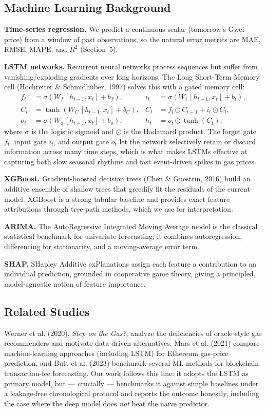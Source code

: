 \documentclass[11pt,a4paper]{article}
\begin{document}
\subsection{Machine Learning Background}
\textbf{Time-series regression.} We predict a continuous scalar (tomorrow's Gwei price) from a
window of past observations, so the natural error metrics are MAE, RMSE, MAPE, and $R^2$
(Section~5).

\textbf{LSTM networks.} Recurrent neural networks process sequences but suffer from
vanishing/exploding gradients over long horizons. The Long Short-Term Memory cell
(Hochreiter \& Schmidhuber, 1997) solves this with a gated memory cell:
\begin{align}
f_t &= \sigma(W_f\,[h_{t-1},x_t] + b_f), &
i_t &= \sigma(W_i\,[h_{t-1},x_t] + b_i), \\
\tilde{C}_t &= \tanh(W_C\,[h_{t-1},x_t] + b_C), &
C_t &= f_t \odot C_{t-1} + i_t \odot \tilde{C}_t, \\
o_t &= \sigma(W_o\,[h_{t-1},x_t] + b_o), &
h_t &= o_t \odot \tanh(C_t),
\end{align}
where $\sigma$ is the logistic sigmoid and $\odot$ is the Hadamard product. The forget gate
$f_t$, input gate $i_t$, and output gate $o_t$ let the network selectively retain or discard
information across many time steps, which is what makes LSTMs effective at capturing both slow
seasonal rhythms and fast event-driven spikes in gas prices.

\textbf{XGBoost.} Gradient-boosted decision trees (Chen \& Guestrin, 2016) build an additive
ensemble of shallow trees that greedily fit the residuals of the current model. XGBoost is a
strong tabular baseline and provides exact feature attributions through tree-path methods, which
we use for interpretation.

\textbf{ARIMA.} The AutoRegressive Integrated Moving Average model is the classical statistical
benchmark for univariate forecasting; it combines autoregression, differencing for stationarity,
and a moving-average error term.

\textbf{SHAP.} SHapley Additive exPlanations assign each feature a contribution to an individual
prediction, grounded in cooperative game theory, giving a principled, model-agnostic notion of
feature importance.

\subsection{Related Studies}
Werner et al. (2020), \emph{Step on the Gas?}, analyze the deficiencies of oracle-style gas
recommenders and motivate data-driven alternatives. Mars et al. (2021) compare machine-learning
approaches (including LSTM) for Ethereum gas-price prediction, and Butt et al. (2023) benchmark
several ML methods for blockchain transaction-fee forecasting. Our work follows this line:
it adopts the LSTM as primary model, but --- crucially --- benchmarks it against simple baselines
under a leakage-free chronological protocol and reports the outcome honestly, including the case
where the deep model does \emph{not} beat the na\"ive predictor.
\end{document}
